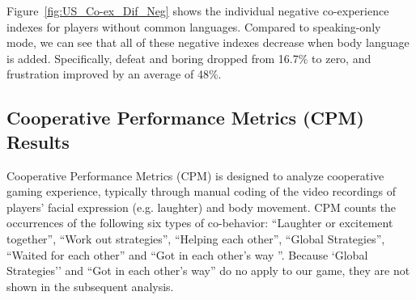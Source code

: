Figure~\ref{fig:US_Co-ex_Dif_Neg} shows the individual negative co-experience indexes for players without common languages. Compared to speaking-only mode, we can see that all of these negative indexes decrease when body language is added. Specifically, defeat and boring dropped from 16.7\% to zero, and frustration improved by an average of 48\%. 



\subsection{Cooperative Performance Metrics (CPM) Results}

Cooperative Performance Metrics (CPM)\cite{CPMs} is designed to analyze cooperative gaming experience, typically through manual coding of the video recordings of players' facial expression (e.g. laughter) and body movement. CPM counts the occurrences of the following six types of co-behavior: ``Laughter or excitement together'', ``Work out strategies'', ``Helping each other'', ``Global Strategies'', ``Waited for each other'' and ``Got in each other's way ''.
Because `Global Strategies'' and ``Got in each other's way'' do no apply to our game, they are not shown in the subsequent analysis.




